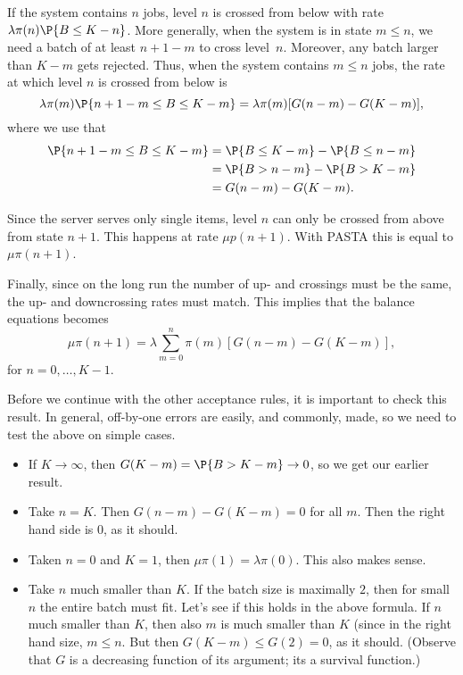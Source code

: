 \begin{exercise}
\begin{solution}
  If the system contains $n$ jobs,  level $n$ is
  crossed from below with rate $\lambda \pi(n) \P{B \leq K-n}$.  More generally,
  when the system is in state $m\leq n$, we need a batch of at least
  $n+1-m$ to cross level~$n$. Moreover, any batch larger than $K-m$
  gets rejected. Thus, when the system contains $m \leq n $ jobs, the
  rate at which level $n$ is crossed from below is
  \begin{equation*}
  \lambda \pi(m) \P{n+1-m\leq B \leq K-m}  = \lambda \pi(m)
  [G(n-m)-G(K-m)],
  \end{equation*}
where we use that
\begin{align*}
\P{n+1-m\leq B \leq K-m} 
&= \P{B \leq K-m} - \P{B \leq n-m}  \\
&= \P{B > n-m} - \P{B > K-m} \\
&= G(n-m)-G(K-m).
\end{align*}

  Since the server serves only single items, level $n$ can only be
  crossed from above from state $n+1$. This happens at rate $\mu p(n+1)$. With PASTA this is equal to $\mu \pi(n+1)$.

  Finally, since on the long run the number of up- and crossings must
  be the same, the up- and downcrossing rates must match. This implies
  that the balance equations becomes
  \begin{equation*}
    \mu \pi(n+1) = \lambda \sum_{m=0}^n \pi(m)   [G(n-m)-G(K-m)],
  \end{equation*}
  for $n=0,\ldots, K-1$. 

  Before we continue with the other acceptance rules, it is important
  to check this result.  In general, off-by-one errors are easily, and
  commonly, made, so we need to test the above on simple cases. 
  \begin{itemize}
  \item  If $K\to \infty$, then $G(K-m)=\P{B>K-m}\to 0$, so we get our earlier result. 
  \item Take $n=K$. Then $G(n-m)-G(K-m)=0$ for all $m$. Then the right hand side is 0, as it should.
  \item Taken $n=0$ and $K=1$, then $\mu \pi(1)= \lambda \pi(0)$. This also makes sense. 
  \item Take $n$ much smaller than $K$. If the batch size is maximally
    $2$, then for small $n$ the entire batch must fit. Let's see if
    this holds in the above formula. If $n$ much smaller than $K$,
    then also $m$ is much smaller than $K$ (since in the right hand
    size, $m\leq n$. But then $G(K-m) \leq G(2) = 0$, as it
    should. (Observe that $G$ is a decreasing function of its argument;
    its a survival function.)
  \end{itemize}


\end{solution}
\end{exercise}
